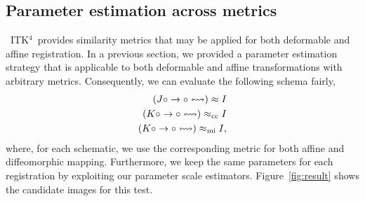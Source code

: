 \documentclass{llncs}
\newcommand{\tk}{~ITK$^{\text{4}}$~}
\begin{document}
\subsection{Parameter estimation across metrics}
\tk provides similarity metrics that may be applied for both
deformable and affine registration.  In a previous section, we
provided a parameter estimation strategy that is applicable to both
deformable and affine transformations with arbitrary metrics.  
Consequently, we can evaluate the
following schema fairly,
\begin{eqnarray}
(J \circ \rightarrow \circ \leftrightsquigarrow ) \approx I  \\  \notag
(K \circ \rightarrow \circ \leftrightsquigarrow ) \approx_\text{cc} I  \\ \notag
(K \circ \rightarrow \circ \leftrightsquigarrow ) \approx_\text{mi} I,
\notag 
\end{eqnarray}
where, for each schematic, we use the corresponding metric for both
affine and diffeomorphic mapping.  Furthermore, we keep the same
parameters for each registration by exploiting our parameter scale
estimators.  Figure~\ref{fig:result} shows the candidate images for
this test. 
\end{document}
